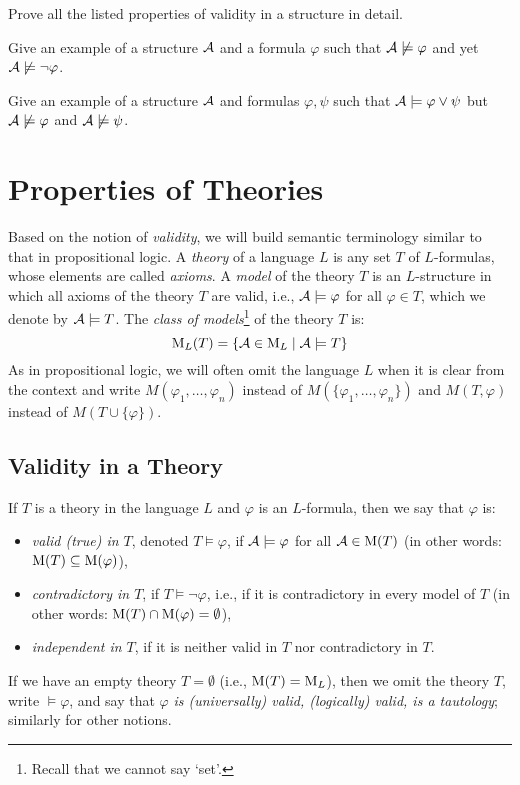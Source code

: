 \begin{exercise}
    Prove all the listed properties of validity in a structure in detail.
\end{exercise}

\begin{exercise}
    Give an example of a structure $\mathcal{A}$ and a formula $\varphi$ such that $\mathcal{A}\not\models\varphi$ and yet $\mathcal{A}\not\models\neg\varphi$.
\end{exercise}

\begin{exercise}
    Give an example of a structure $\mathcal{A}$ and formulas $\varphi,\psi$ such that $\mathcal{A}\models\varphi\lor\psi$ but $\mathcal{A}\not\models\varphi$ and $\mathcal{A}\not\models\psi$.
\end{exercise}


\section{Properties of Theories}

Based on the notion of \emph{validity}, we will build semantic terminology similar to that in propositional logic. A \emph{theory} of a language $L$ is any set $T$ of $L$-formulas, whose elements are called \emph{axioms}. A \emph{model} of the theory $T$ is an $L$-structure in which all axioms of the theory $T$ are valid, i.e., $\mathcal{A}\models\varphi$ for all $\varphi\in T$, which we denote by $\mathcal{A}\models T$. The \emph{class of models}\footnote{Recall that we cannot say `set'.} of the theory $T$ is:
$$
\operatorname{M}_L(T)=\{\mathcal{A}\in\operatorname{M}_L\mid\mathcal{A}\models T\}
$$
As in propositional logic, we will often omit the language $L$ when it is clear from the context and write $M(\varphi_1,\dots,\varphi_n)$ instead of $M(\{\varphi_1,\dots,\varphi_n\})$ and $M(T,\varphi)$ instead of $M(T\cup\{\varphi\})$.

\subsection{Validity in a Theory}

If $T$ is a theory in the language $L$ and $\varphi$ is an $L$-formula, then we say that $\varphi$ is: 
\begin{itemize}
    \item \emph{valid (true) in $T$}, denoted $T\models\varphi$, if $\mathcal{A}\models\varphi$ for all $\mathcal{A}\in\operatorname{M}(T)$ (in other words: $\operatorname{M}(T)\subseteq\operatorname{M}(\varphi)$),
    \item \emph{contradictory in $T$}, if $T\models\neg\varphi$, i.e., if it is contradictory in every model of $T$ (in other words: $\operatorname{M}(T)\cap\operatorname{M}(\varphi)=\emptyset$),
    \item \emph{independent in $T$}, if it is neither valid in $T$ nor contradictory in $T$.
\end{itemize}
If we have an empty theory $T=\emptyset$ (i.e., $\operatorname{M}(T)=\operatorname{M}_L$), then we omit the theory $T$, write $\models\varphi$, and say that $\varphi$ \emph{is (universally) valid, (logically) valid, is a tautology}; similarly for other notions.

